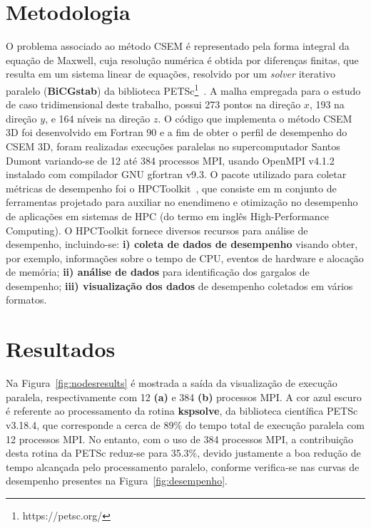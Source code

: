 \documentclass[12pt]{article}
\begin{document}
\section{Metodologia}
\label{sec:metodo}
%
O problema associado ao método CSEM é representado pela forma integral da equação de Maxwell, cuja resolução numérica é obtida por diferenças finitas, que resulta em um sistema linear de equações, resolvido por um \textit{solver} iterativo paralelo (\textbf{BiCGstab}) da biblioteca PETSc\footnote[1]{https://petsc.org/}~\cite{petsc-efficient}. A malha empregada para o estudo de caso tridimensional deste trabalho, possui 273 pontos na direção $x$, 193 na direção $y$, e 164 níveis na direção $z$. O código que implementa o método CSEM 3D foi desenvolvido em Fortran 90 e a fim de obter o perfil de desempenho do CSEM 3D, foram realizadas execuções paralelas no supercomputador Santos Dumont variando-se de 12 até 384 processos MPI, usando OpenMPI v4.1.2 instalado com compilador GNU gfortran v9.3. O pacote utilizado para coletar métricas de desempenho foi o  HPCToolkit~\cite{hpctoolkit2010}, que consiste em m conjunto de ferramentas projetado para auxiliar no enendimeno e otimização no desempenho de aplicações em sistemas de HPC (do termo em inglês High-Performance Computing). O HPCToolkit fornece diversos recursos para análise de desempenho, incluindo-se: \textbf{i) coleta de dados de desempenho} visando obter, por exemplo, informações sobre o tempo de CPU, eventos de hardware e alocação de memória; \textbf{ii) análise de dados} para identificação dos gargalos de desempenho; \textbf{iii) visualização dos dados} de desempenho coletados em vários formatos.


\section{Resultados}              
\label{sec:resultados}
Na Figura~\ref{fig:nodesresults} é mostrada a saída da visualização de execução paralela, respectivamente com 12 \textbf{(a)} e 384 \textbf{(b)} processos MPI. A cor azul escuro é referente ao processamento da rotina {\ttfamily \textbf{kspsolve}}, da biblioteca científica PETSc v3.18.4, que corresponde a cerca de 89\% do tempo total de execução paralela com 12 processos MPI. No entanto, com o uso de 384 processos MPI, a contribuição desta rotina da PETSc reduz-se para 35.3\%, devido justamente a boa redução de tempo alcançada pelo processamento paralelo, conforme verifica-se nas curvas de desempenho presentes na Figura~\ref{fig:desempenho}. 
\end{document}
